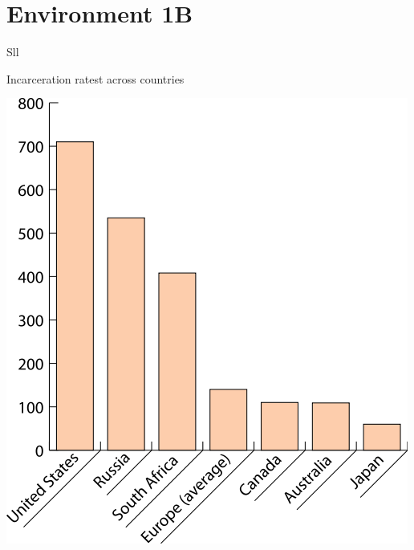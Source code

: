 \section{Environment 1B}


\begin{chart}{S}{ll}
\caption{Incarceration ratest across countries}
\label{chart:incarceration}
\includegraphics[width=\chartwidth,height=\chartheight]{incarceration}  
\end{chart}



